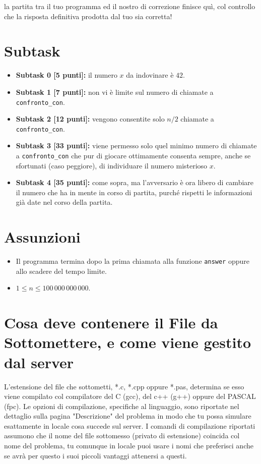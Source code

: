 \documentclass[a4paper,11pt]{article}
\begin{document}
  \vspace{0.2cm}
  
  \noindent
  la partita tra il tuo programma ed il nostro di correzione finisce quì,
  col controllo che la risposta definitiva prodotta dal tuo sia corretta!
  
  \section*{Subtask}
  \begin{itemize}
    \item \textbf{Subtask 0 [5 punti]:} il numero $x$ da indovinare è $42$.
    \item \textbf{Subtask 1 [7 punti]:} non vi è limite sul numero di chiamate a \texttt{confronto_con}.
    \item \textbf{Subtask 2 [12 punti]:} vengono consentite solo $n/2$ chiamate a \texttt{confronto_con}.
    \item \textbf{Subtask 3 [33 punti]:} viene permesso solo quel minimo numero di chiamate a \texttt{confronto_con} che pur di giocare ottimamente consenta sempre, anche se sfortunati (caso peggiore), di individuare il numero misterioso $x$.
    \item \textbf{Subtask 4 [35 punti]:} come sopra, ma l'avversario è ora libero di cambiare il numero che ha in mente in corso di partita, purché rispetti le informazioni già date nel corso della partita.
  \end{itemize}
  
  \section*{Assunzioni}
  \begin{itemize}[nolistsep, noitemsep]
    \item Il programma termina dopo la prima chiamata alla funzione \texttt{answer} oppure allo scadere del tempo limite.
    \item $1 \le n \le 100\,000\,000\,000$.
  \end{itemize}

  \section*{Cosa deve contenere il File da Sottomettere, e come viene gestito dal server}

  L'estensione del file che sottometti, *.c, *.cpp oppure *.pas,
  determina se esso viene compilato col compilatore del C (gcc),
  del c++ (g++) oppure del PASCAL (fpc).
  Le opzioni di compilazione, specifiche al linguaggio,
  sono riportate nel dettaglio sulla pagina "Descrizione" del problema
  in modo che tu possa simulare esattamente in locale cosa succede sul server.
  I comandi di compilazione riportati assumono che il nome del file sottomesso (privato di estensione) coincida col nome del problema, tu comunque in locale puoi usare i nomi che preferisci anche se avrà per questo i suoi piccoli vantaggi attenersi a questi.
\end{document}
